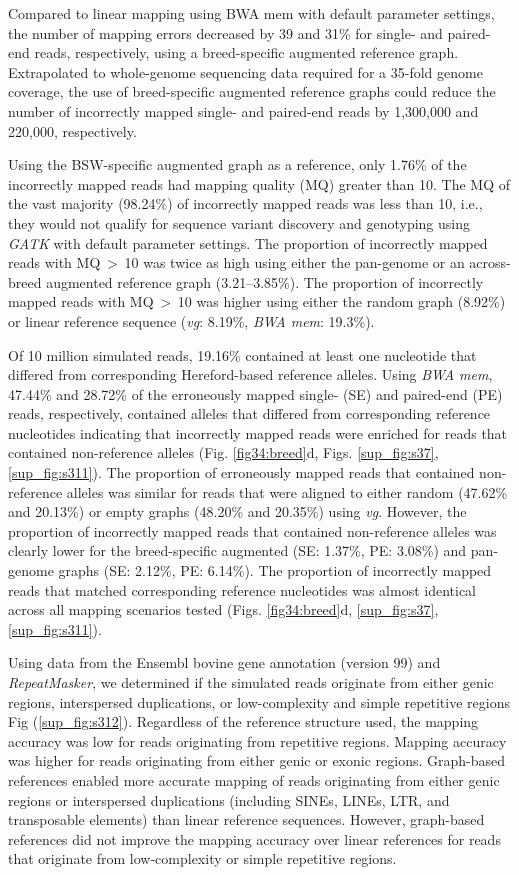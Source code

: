\documentclass[../main.tex]{subfiles}
\begin{document}
Compared to linear mapping using BWA mem with default parameter settings, the number of mapping errors decreased by 39 and 31\% for single- and paired-end reads, respectively, using a breed-specific augmented reference graph. Extrapolated to whole-genome sequencing data required for a 35-fold genome coverage, the use of breed-specific augmented reference graphs could reduce the number of incorrectly mapped single- and paired-end reads by 1,300,000 and 220,000, respectively.

Using the BSW-specific augmented graph as a reference, only 1.76\% of the incorrectly mapped reads had mapping quality (MQ) greater than 10. The MQ of the vast majority (98.24\%) of incorrectly mapped reads was less than 10, i.e., they would not qualify for sequence variant discovery and genotyping using \emph{GATK} with default parameter settings. The proportion of incorrectly mapped reads with MQ $>$ 10 was twice as high using either the pan-genome or an across-breed augmented reference graph (3.21–3.85\%). The proportion of incorrectly mapped reads with MQ $>$ 10 was higher using either the random graph (8.92\%) or linear reference sequence (\emph{vg}: 8.19\%, \emph{BWA mem}: 19.3\%).

Of 10 million simulated reads, 19.16\% contained at least one nucleotide that differed from corresponding Hereford-based reference alleles. Using \emph{BWA mem}, 47.44\% and 28.72\% of the erroneously mapped single- (SE) and paired-end (PE) reads, respectively, contained alleles that differed from corresponding reference nucleotides indicating that incorrectly mapped reads were enriched for reads that contained non-reference alleles (Fig. \ref{fig34:breed}d, Figs. \ref{sup_fig:s37}, \ref{sup_fig:s311}). The proportion of erroneously mapped reads that contained non-reference alleles was similar for reads that were aligned to either random (47.62\% and 20.13\%) or empty graphs (48.20\% and 20.35\%) using \emph{vg}. However, the proportion of incorrectly mapped reads that contained non-reference alleles was clearly lower for the breed-specific augmented (SE: 1.37\%, PE: 3.08\%) and pan-genome graphs (SE: 2.12\%, PE: 6.14\%). The proportion of incorrectly mapped reads that matched corresponding reference nucleotides was almost identical across all mapping scenarios tested (Figs. \ref{fig34:breed}d, \ref{sup_fig:s37}, \ref{sup_fig:s311}).

Using data from the Ensembl bovine gene annotation (version 99) and \emph{RepeatMasker}, we determined if the simulated reads originate from either genic regions, interspersed duplications, or low-complexity and simple repetitive regions Fig (\ref{sup_fig:s312}). Regardless of the reference structure used, the mapping accuracy was low for reads originating from repetitive regions. Mapping accuracy was higher for reads originating from either genic or exonic regions. Graph-based references enabled more accurate mapping of reads originating from either genic regions or interspersed duplications (including SINEs, LINEs, LTR, and transposable elements) than linear reference sequences. However, graph-based references did not improve the mapping accuracy over linear references for reads that originate from low-complexity or simple repetitive regions.
\end{document}

